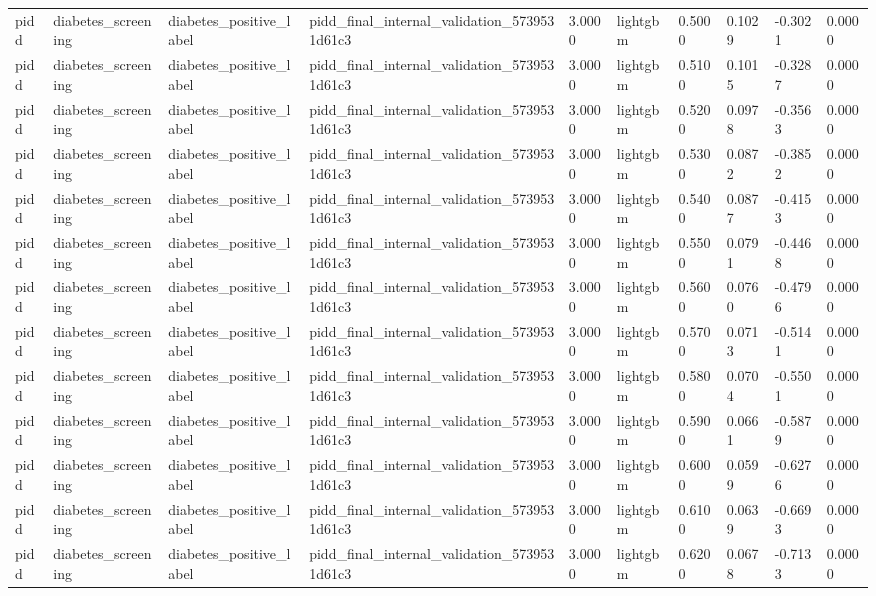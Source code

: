 \begin{tabular}{llllllllll}
pidd & diabetes\_screening & diabetes\_positive\_label & pidd\_final\_internal\_validation\_5739531d61c3 & 3.0000 & lightgbm & 0.5000 & 0.1029 & -0.3021 & 0.0000 \\
pidd & diabetes\_screening & diabetes\_positive\_label & pidd\_final\_internal\_validation\_5739531d61c3 & 3.0000 & lightgbm & 0.5100 & 0.1015 & -0.3287 & 0.0000 \\
pidd & diabetes\_screening & diabetes\_positive\_label & pidd\_final\_internal\_validation\_5739531d61c3 & 3.0000 & lightgbm & 0.5200 & 0.0978 & -0.3563 & 0.0000 \\
pidd & diabetes\_screening & diabetes\_positive\_label & pidd\_final\_internal\_validation\_5739531d61c3 & 3.0000 & lightgbm & 0.5300 & 0.0872 & -0.3852 & 0.0000 \\
pidd & diabetes\_screening & diabetes\_positive\_label & pidd\_final\_internal\_validation\_5739531d61c3 & 3.0000 & lightgbm & 0.5400 & 0.0877 & -0.4153 & 0.0000 \\
pidd & diabetes\_screening & diabetes\_positive\_label & pidd\_final\_internal\_validation\_5739531d61c3 & 3.0000 & lightgbm & 0.5500 & 0.0791 & -0.4468 & 0.0000 \\
pidd & diabetes\_screening & diabetes\_positive\_label & pidd\_final\_internal\_validation\_5739531d61c3 & 3.0000 & lightgbm & 0.5600 & 0.0760 & -0.4796 & 0.0000 \\
pidd & diabetes\_screening & diabetes\_positive\_label & pidd\_final\_internal\_validation\_5739531d61c3 & 3.0000 & lightgbm & 0.5700 & 0.0713 & -0.5141 & 0.0000 \\
pidd & diabetes\_screening & diabetes\_positive\_label & pidd\_final\_internal\_validation\_5739531d61c3 & 3.0000 & lightgbm & 0.5800 & 0.0704 & -0.5501 & 0.0000 \\
pidd & diabetes\_screening & diabetes\_positive\_label & pidd\_final\_internal\_validation\_5739531d61c3 & 3.0000 & lightgbm & 0.5900 & 0.0661 & -0.5879 & 0.0000 \\
pidd & diabetes\_screening & diabetes\_positive\_label & pidd\_final\_internal\_validation\_5739531d61c3 & 3.0000 & lightgbm & 0.6000 & 0.0599 & -0.6276 & 0.0000 \\
pidd & diabetes\_screening & diabetes\_positive\_label & pidd\_final\_internal\_validation\_5739531d61c3 & 3.0000 & lightgbm & 0.6100 & 0.0639 & -0.6693 & 0.0000 \\
pidd & diabetes\_screening & diabetes\_positive\_label & pidd\_final\_internal\_validation\_5739531d61c3 & 3.0000 & lightgbm & 0.6200 & 0.0678 & -0.7133 & 0.0000 \\

\end{tabular}
